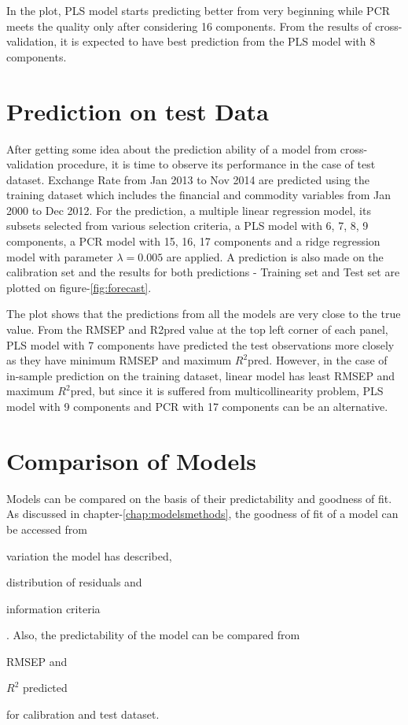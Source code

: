 \documentclass[12pt, lot, lof]{thesis}\usepackage[]{graphicx}\usepackage[]{color}
\begin{document}
In the plot, PLS model starts predicting better from very beginning while PCR meets the quality only after considering 16 components. From the results of cross-validation, it is expected to have best prediction from the PLS model with 8 components.

\section{Prediction on test Data}
\label{sec:predTest}


After getting some idea about the prediction ability of a model from cross-validation procedure, it is time to observe its performance in the case of test dataset. Exchange Rate from Jan 2013 to Nov 2014 are predicted using the training dataset which includes the financial and commodity variables from Jan 2000 to Dec 2012. For the prediction, a multiple linear regression model, its subsets selected from various selection criteria, a PLS model with 6, 7, 8, 9 components, a PCR model with 15, 16, 17 components and a ridge regression model with parameter $\lambda=0.005$ are applied. A prediction is also made on the calibration set and the results for both predictions - Training set and Test set are plotted on figure-\ref{fig:forecast}.

The plot shows that the predictions from all the models are very close to the true value. From the RMSEP and R2pred value at the top left corner of each panel, PLS model with 7 components have predicted the test observations more closely as they have minimum RMSEP and maximum $R^2$pred. However, in the case of in-sample prediction on the training dataset, linear model has least RMSEP and maximum $R^2$pred, but since it is suffered from multicollinearity problem, PLS model with 9 components and PCR with 17 components can be an alternative.

\section{Comparison of Models}
\label{sec:modelComp}

Models can be compared on the basis of their predictability and goodness of fit. As discussed in chapter-\ref{chap:modelsmethods}, the goodness of fit of a model can be accessed from \begin{inlinelist} \item variation the model has described,\item distribution of residuals and \item information criteria  \end{inlinelist}. Also, the predictability of the model can be compared from \begin{inlinelist} \item RMSEP and \item $R^2$ predicted \end{inlinelist} for calibration and test dataset.
\end{document}
